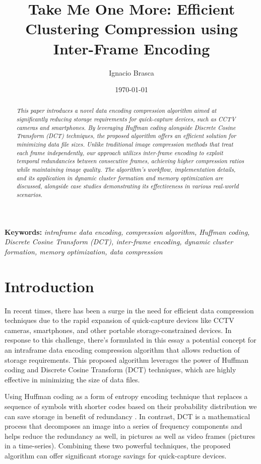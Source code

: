 \documentclass[twocolumn]{article}
\title{Take Me One More: Efficient Clustering Compression using Inter-Frame Encoding}
\author{Ignacio Brasca}
\date{\today}
\begin{document}
\maketitle

\begin{abstract}
    \textit{This paper introduces a novel data encoding compression algorithm aimed at significantly reducing storage requirements for quick-capture devices, such as CCTV cameras and smartphones. By leveraging Huffman coding alongside Discrete Cosine Transform (DCT) techniques, the proposed algorithm offers an efficient solution for minimizing data file sizes. Unlike traditional image compression methods that treat each frame independently, our approach utilizes inter-frame encoding to exploit temporal redundancies between consecutive frames, achieving higher compression ratios while maintaining image quality. The algorithm's workflow, implementation details, and its application in dynamic cluster formation and memory optimization are discussed, alongside case studies demonstrating its effectiveness in various real-world scenarios.}
    \end{abstract}
    
    \textbf{Keywords:} \textit{intraframe data encoding, compression algorithm, Huffman coding, Discrete Cosine Transform (DCT), inter-frame encoding, dynamic cluster formation, memory optimization, data compression}    
    

\section{Introduction}
In recent times, there has been a surge in the need for efficient data compression techniques due to the rapid expansion of quick-capture devices like CCTV cameras, smartphones, and other portable storage-constrained devices. In response to this challenge, there's formulated in this essay a potential concept for an intraframe data encoding compression algorithm that allows reduction of storage requirements. This proposed algorithm leverages the power of Huffman coding and Discrete Cosine Transform (DCT) techniques, which are highly effective in minimizing the size of data files.

Using Huffman coding as a form of entropy encoding technique that replaces a sequence of symbols with shorter codes based on their probability distribution we can save storage in benefit of redundancy \cite{van1976construction}. In contrast, DCT is a mathematical process \cite{narasimha1978computation} that decomposes an image into a series of frequency components and helps reduce the redundancy as well, in pictures as well as video frames (pictures in a time-series). Combining these two powerful techniques, the proposed algorithm can offer significant storage savings for quick-capture devices.
\end{document}
